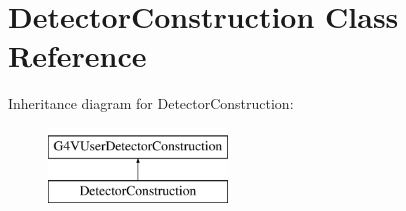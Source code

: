 \hypertarget{class_detector_construction}{}\section{Detector\+Construction Class Reference}
\label{class_detector_construction}
Inheritance diagram for Detector\+Construction\+:\begin{figure}[H]
\begin{center}
\leavevmode
\includegraphics[height=2.000000cm]{class_detector_construction}
\end{center}
\end{figure}
